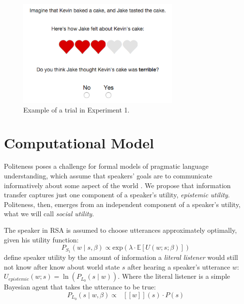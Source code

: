 \documentclass[10pt,letterpaper]{article}
\newcommand{\denote}[1]{\mbox{ $[\![ #1 ]\!]$}}
\begin{document}

\begin{figure}[tbh]
\begin{centering} 
\includegraphics[width=3.2in]{figures/example.png}
\caption{\label{fig:ex} Example of a trial in Experiment 1.}
\end{centering} 
\end{figure}


\section{Computational Model}

Politeness poses a challenge for formal models of pragmatic language understanding, which assume that speakers' goals are to communicate informatively about some aspect of the world \cite{Frank2012, Goodman2013}. 
We propose that information transfer captures just one component of a speaker's utility, \emph{epistemic utility}.
Politeness, then, emerges from an independent component of a speaker's utility, what we will call \emph{social utility}. 

The speaker in RSA is assumed to choose utterances approximately optimally, given his utility function:
\begin{equation}
P_{S_1}(w \mid s, \beta) \propto \mathrm{exp}(\lambda \cdot \mathbb{E}[U(w; s; \beta)])\label{eq:S1}
\end{equation}
 define speaker utility by the amount of information a \emph{literal listener} would still not know after know about world state $s$ after hearing a speaker's utterance $w$: 
$U_{epistemic}(w; s) = \ln(P_{L_0}(s \mid w)) $.
Where the literal listener is a simple Bayesian agent that takes the utterance to be true:
\begin{equation}
P_{L_0}(s \mid w, \beta)\propto \denote{w}(s) \cdot P(s) \label{eq:L0}
\end{equation}
\end{document}
